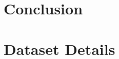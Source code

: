 \documentclass[twoside,11pt]{article}
\begin{document}
\section{Conclusion}



\acks{}

\appendix

\section{Dataset Details}

\end{document}
